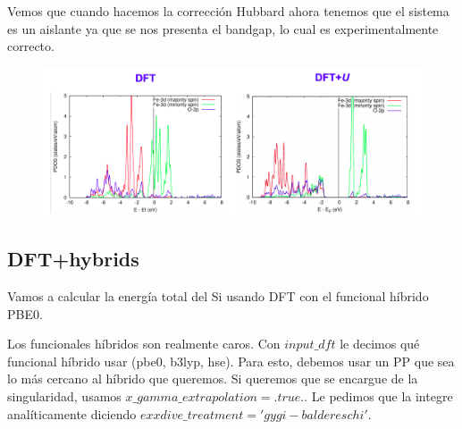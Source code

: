  Vemos que cuando hacemos la corrección Hubbard ahora tenemos que el sistema es un aislante ya que se nos presenta el bandgap, lo cual es experimentalmente correcto.

  \begin{figure}[H]
    \centering
      \includegraphics[scale = 0.5]{figs/D4/FeO.png}
    \end{figure}


\subsection{DFT+hybrids}

  Vamos a calcular la energía total del Si usando DFT con el funcional híbrido PBE0.

  Los funcionales híbridos son realmente caros. Con $input\_dft$ le decimos qué funcional híbrido usar (pbe0, b3lyp, hse). Para esto, debemos usar un PP que sea lo más cercano al híbrido que queremos. Si queremos que se encargue de la singularidad, usamos $x\_gamma\_extrapolation = .true.$. Le pedimos que la integre analíticamente diciendo $exxdive\_treatment = 'gygi-baldereschi'$.


